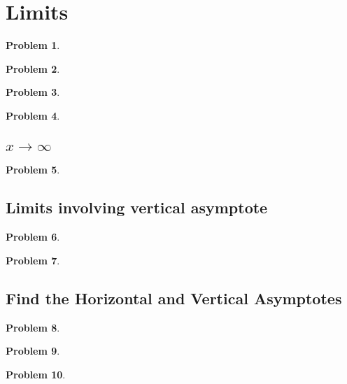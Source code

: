 \documentclass{article}
\newtheorem{problem}{Problem}
\begin{document}
\section{Limits}
\begin{problem}

\end{problem}
\begin{problem}

\end{problem}

\begin{problem}

\end{problem}
\begin{problem}

\end{problem}
\subsection{$x\to\infty$}
\begin{problem}

\end{problem}

\subsection{Limits involving vertical asymptote}
\begin{problem}

\end{problem}
\begin{problem}

\end{problem}
\subsection{Find the Horizontal and Vertical Asymptotes}
\begin{problem}

\end{problem}
\begin{problem}

\end{problem}
\begin{problem}

\end{problem}
\end{document}
